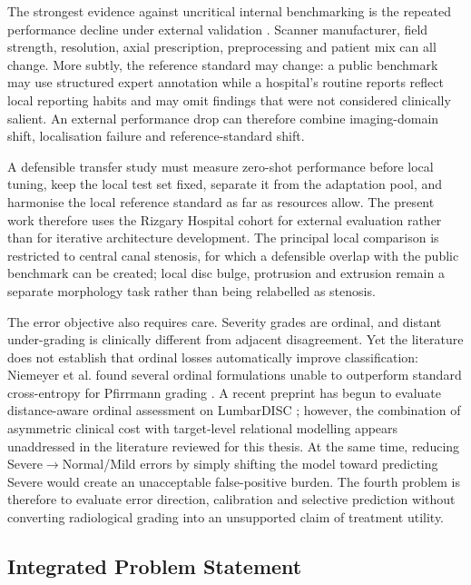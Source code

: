 The strongest evidence against uncritical internal benchmarking is the repeated
performance decline under external validation
\cite{compte2023are,mcsweeney2023external,zhang2023deep}. Scanner manufacturer,
field strength, resolution, axial prescription, preprocessing and patient mix can
all change. More subtly, the reference standard may change: a public benchmark may
use structured expert annotation while a hospital's routine reports reflect local
reporting habits and may omit findings that were not considered clinically salient.
An external performance drop can therefore combine imaging-domain shift,
localisation failure and reference-standard shift.

A defensible transfer study must measure zero-shot performance before local tuning,
keep the local test set fixed, separate it from the adaptation pool, and harmonise
the local reference standard as far as resources allow. The present work therefore
uses the Rizgary Hospital cohort for external evaluation rather than for iterative
architecture development. The principal local comparison is restricted to central
canal stenosis, for which a defensible overlap with the public benchmark can be
created; local disc bulge, protrusion and extrusion remain a separate morphology
task rather than being relabelled as stenosis.

The error objective also requires care. Severity grades are ordinal, and distant
under-grading is clinically different from adjacent disagreement. Yet the literature
does not establish that ordinal losses automatically improve classification:
Niemeyer et al. found several ordinal formulations unable to outperform standard
cross-entropy for Pfirrmann grading \cite{niemeyer2021a}. A recent preprint has begun to evaluate distance-aware ordinal assessment on
LumbarDISC \cite{trinc2026beyond}; however, the combination of asymmetric clinical
cost with target-level relational modelling appears unaddressed in the literature
reviewed for this thesis.
At the same time, reducing
Severe$\rightarrow$Normal/Mild errors by simply shifting the model toward predicting
Severe would create an unacceptable false-positive burden. The fourth problem is
therefore to evaluate error direction, calibration and selective prediction without
converting radiological grading into an unsupported claim of treatment utility.

\subsection{Integrated Problem Statement}
\label{sec:intro-integrated-problem}

